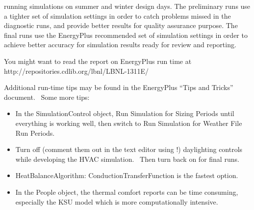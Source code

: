 running simulations on summer and winter design days. The preliminary runs use a tighter set of simulation settings in order to catch problems missed in the diagnostic runs, and provide better results for quality assurance purpose. The final runs use the EnergyPlus recommended set of simulation settings in order to achieve better accuracy for simulation results ready for review and reporting.

You might want to read the report on EnergyPlus run time at http://repositories.cdlib.org/lbnl/LBNL-1311E/

Additional run-time tips may be found in the EnergyPlus ``Tips and Tricks'' document.~ Some more tips:

\begin{itemize}
\item
  In the SimulationControl object, Run Simulation for Sizing Periods until everything is working well, then switch to Run Simulation for Weather File Run Periods.
\item
  Turn off (comment them out in the text editor using !) daylighting controls while developing the HVAC simulation.~ Then turn back on for final runs.
\item
  HeatBalanceAlgorithm: ConductionTransferFunction is the fastest option.
\item
  In the People object, the thermal comfort reports can be time consuming, especially the KSU model which is more computationally intensive.
\end{itemize}
